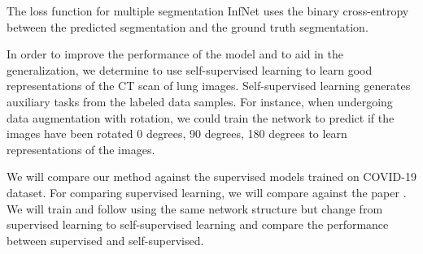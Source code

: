 The loss function for multiple segmentation InfNet uses the binary cross-entropy between the predicted segmentation and the ground truth segmentation.

In order to improve the performance of the model and to aid in the generalization, we determine to use self-supervised learning to learn good representations of the CT scan of lung images. Self-supervised learning generates auxiliary tasks from the labeled data samples. For instance, when undergoing data augmentation with rotation, we could train the network to predict if the images have been rotated 0 degrees, 90 degrees, 180 degrees to learn representations of the images. 




We will compare our method against the supervised %
\cite {ref13}models trained on COVID-19 dataset. For comparing supervised learning, we will compare against the paper \cite{ref13}. We will train and follow using the same network structure but change from supervised learning to self-supervised learning and compare the performance between supervised and self-supervised.


